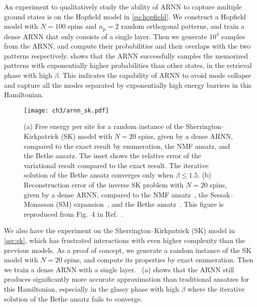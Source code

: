 An experiment to qualitatively study the ability of ARNN to capture multiple ground states is on the Hopfield model in \cref{eq:hopfield}. We construct a Hopfield model with $N = 100$ spins and $n_\text{p} = 2$ random orthogonal patterns, and train a dense ARNN that only consists of a single layer. Then we generate $10^4$ samples from the ARNN, and compute their probabilities and their overlaps with the two patterns respectively.  shows that the ARNN successfully samples the memorized patterns with exponentially higher probabilities than other states, in the retrieval phase with high $\beta$. This indicates the capability of ARNN to avoid mode collapse and capture all the modes separated by exponentially high energy barriers in this Hamiltonian.

\begin{figure}[htb]
\centering
\texttt{[image: ch3/arnn\_sk.pdf]}
\caption[ARNN results of Sherrington--Kirkpatrick (SK) model and inverse SK problem]{
(a) Free energy per site for a random instance of the Sherrington--Kirkpatrick (SK) model with $N = 20$ spins, given by a dense ARNN, compared to the exact result by enumeration, the NMF ansatz, and the Bethe ansatz. The inset shows the relative error of the variational result compared to the exact result.
The iterative solution of the Bethe ansatz converges only when $\beta \le 1.5$.
(b) Reconstruction error of the inverse SK problem with $N = 20$ spins, given by a dense ARNN, compared to the NMF ansatz~\cite{roudi2009ising}, the Sessak--Monasson (SM) expansion~\cite{sessak2009small}, and the Bethe ansatz~\cite{ricci2012bethe}.
This figure is reproduced from Fig.~4 in Ref.~\cite{wu2019solving}.
}
\label{fig:arnn-sk}
\end{figure}

We also have the experiment on the Sherrington--Kirkpatrick (SK) model in \cref{sec:sk}, which has frustrated interactions with even higher complexity than the previous models. As a proof of concept, we generate a random instance of the SK model with $N = 20$ spins, and compute its properties by exact enumeration. Then we train a dense ARNN with a single layer. ~(a) shows that the ARNN still produces significantly more accurate approximation than traditional ansatzes for this Hamiltonian, especially in the glassy phase with high $\beta$ where the iterative solution of the Bethe ansatz fails to converge.

